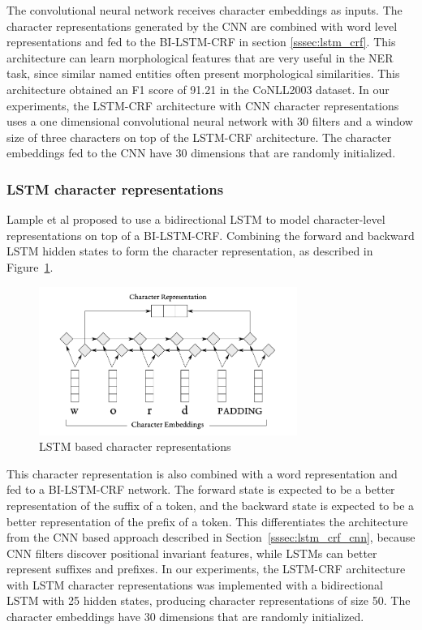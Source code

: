 \documentclass{nle}
\begin{document}
The convolutional neural network receives character embeddings as inputs. The character 
representations generated by the CNN are combined with word level representations 
and fed to the BI-LSTM-CRF in section \ref{sssec:lstm_crf}.
This architecture can learn morphological features that are very
useful in the NER task, since similar named entities often present morphological similarities. 
This architecture obtained an F1 score of 91.21 in the CoNLL2003 dataset. In our experiments, 
the LSTM-CRF architecture with CNN character representations uses a one dimensional convolutional 
neural network with 30 filters and a window size of three characters on top of the LSTM-CRF 
architecture. The character embeddings fed to the CNN have 30 dimensions that are randomly 
initialized.

\subsubsection{LSTM character representations}

Lample et al  proposed to use a bidirectional LSTM to model character-level 
representations on top of a BI-LSTM-CRF. Combining the forward and backward LSTM hidden states 
to form the character representation, as described in Figure~\ref{fig:lstm_char}. 

\begin{figure}[h]
  \centering
  \includegraphics[width=0.75\textwidth]{pics/lstm_char_representations}
  \caption{LSTM based character representations}
  \label{fig:lstm_char}
\end{figure}

This character representation is also combined with a word 
representation and fed to a BI-LSTM-CRF network. 
The forward state is expected to be a better representation of the suffix of 
a token, and the backward state is expected to be a better representation of 
the prefix of a token. This differentiates the architecture
from the CNN based approach described in Section~\ref{sssec:lstm_crf_cnn}, because CNN filters 
discover positional invariant features, while LSTMs can better represent 
suffixes and prefixes. In our experiments, 
the LSTM-CRF architecture with LSTM character representations was implemented with a bidirectional 
LSTM with 25 hidden states, producing character representations of 
size 50. The character embeddings have 30 dimensions that are randomly initialized.
\end{document}
